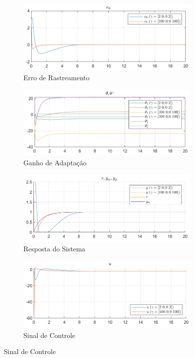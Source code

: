\documentclass[10pt]{article}
\begin{document}
\begin{figure}[h!]
    \centering
    \begin{subfigure}[b]{0.35\textwidth}
        \centering
        \includegraphics[width=\textwidth]{img/fig03a.png}
        \caption{Erro de Rastreamento}
    \end{subfigure}
    \begin{subfigure}[b]{0.35\textwidth}
        \centering
        \includegraphics[width=\textwidth]{img/fig03b.png}
        \caption{Ganho de Adaptação}
    \end{subfigure}

    \begin{subfigure}[b]{0.35\textwidth}
        \centering
        \includegraphics[width=\textwidth]{img/fig03c.png}
        \caption{Resposta do Sistema}
    \end{subfigure}
    \begin{subfigure}[b]{0.35\textwidth}
        \centering
        \includegraphics[width=\textwidth]{img/fig03e.png}
        \caption{Sinal de Controle}
    \end{subfigure}


\end{figure}
\end{document}
